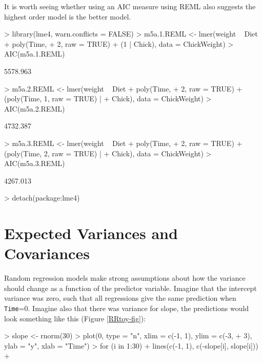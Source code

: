 \documentclass{article}
\begin{document}
It is worth seeing whether using an AIC measure using REML also suggests the highest order model is the better model. 

\begin{Schunk}
\begin{Sinput}
> library(lme4, warn.conflicts = FALSE)
> m5a.1.REML <- lmer(weight ~ Diet + poly(Time, 
+     2, raw = TRUE) + (1 | Chick), data = ChickWeight)
> AIC(m5a.1.REML)
\end{Sinput}
\begin{Soutput}
[1] 5578.963
\end{Soutput}
\begin{Sinput}
> m5a.2.REML <- lmer(weight ~ Diet + poly(Time, 
+     2, raw = TRUE) + (poly(Time, 1, raw = TRUE) | 
+     Chick), data = ChickWeight)
> AIC(m5a.2.REML)
\end{Sinput}
\begin{Soutput}
[1] 4732.387
\end{Soutput}
\begin{Sinput}
> m5a.3.REML <- lmer(weight ~ Diet + poly(Time, 
+     2, raw = TRUE) + (poly(Time, 2, raw = TRUE) | 
+     Chick), data = ChickWeight)
> AIC(m5a.3.REML)
\end{Sinput}
\begin{Soutput}
[1] 4267.013
\end{Soutput}
\begin{Sinput}
> detach(package:lme4)
\end{Sinput}
\end{Schunk}

\section{Expected Variances and Covariances}

Random regression models make strong assumptions about how the variance should change as a function of the predictor variable. Imagine that the intercept variance was zero, such that all regressions give the same prediction when \texttt{Time}=0. Imagine also that there was variance for slope, the predictions would look something like this (Figure \ref{RRtoy-fig}):

\begin{Schunk}
\begin{Sinput}
> slope <- rnorm(30)
> plot(0, type = "n", xlim = c(-1, 1), ylim = c(-3, 
+     3), ylab = "y", xlab = "Time")
> for (i in 1:30) {
+     lines(c(-1, 1), c(-slope[i], slope[i]))
+ }
\end{Sinput}
\end{Schunk}
\end{document}
